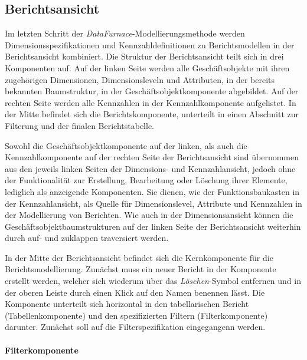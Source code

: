 \documentclass[
  language=german, %
  type=bachelor%
]{isthesis}
\begin{document}
\begin{content}
  \subsection{Berichtsansicht}

  Im letzten Schritt der \textit{DataFurnace}-Modellierungsmethode werden
  Dimensionsspezifikationen und Kennzahldefinitionen zu Berichtsmodellen in der
  Berichtsansicht kombiniert. Die Struktur der Berichtsansicht teilt sich in
  drei Komponenten auf. Auf der linken Seite werden alle Geschäftsobjekte mit
  ihren zugehörigen Dimensionen, Dimensionsleveln und Attributen, in der
  bereits bekannten Baumstruktur, in der Geschäftsobjektkomponente abgebildet.
  Auf der rechten Seite werden alle Kennzahlen in der Kennzahlkomponente
  aufgelistet. In der Mitte befindet sich die Berichtskomponente, unterteilt in
  einen Abschnitt zur Filterung und der finalen Berichtstabelle.

  Sowohl die Geschäftsobjektkomponente auf der linken, als auch die
  Kennzahlkomponente auf der rechten Seite der Berichtsansicht sind übernommen
  aus den jeweils linken Seiten der Dimensions- und Kennzahlansicht, jedoch
  ohne der Funktionalität zur Erstellung, Bearbeitung oder Löschung ihrer
  Elemente, lediglich als anzeigende Komponenten. Sie dienen, wie der
  Funktionsbaukasten in der Kennzahlansicht, als Quelle für Dimensionslevel,
  Attribute und Kennzahlen in der Modellierung von Berichten. Wie auch in der
  Dimensionsansicht können die Geschäftsobjektbaumstrukturen auf der linken
  Seite der Berichtsansicht weiterhin durch auf- und zuklappen traversiert
  werden.

  In der Mitte der Berichtsansicht befindet sich die Kernkomponente für die
  Berichtsmodellierung. Zunächst muss ein neuer Bericht
  in der Komponente erstellt werden, welcher sich wiederum über das
  \textit{Löschen}-Symbol entfernen und in der oberen Leiste durch einen Klick
  auf den Namen benennen lässt. Die Komponente unterteilt sich horizontal in
  den tabellarischen Bericht (Tabellenkomponente) und den spezifizierten
  Filtern (Filterkomponente) darunter. Zunächst soll auf die
  Filterspezifikation eingegangenn werden. 
  
  \paragraph{Filterkomponente}
  

\end{content}
\end{document}
